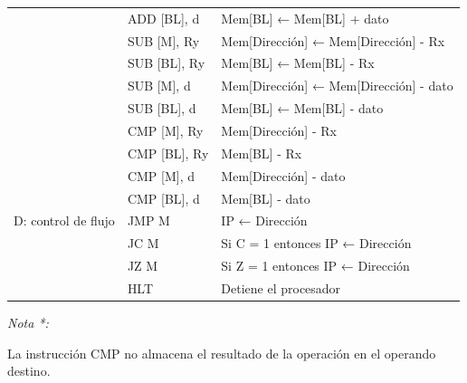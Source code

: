 \documentclass[12pt,oneside]{templates/unerthesis}
\begin{document}
\begin{table}[!h]
{\begin{threeparttable}
\begin{tabular}[t]{>{\raggedright\arraybackslash}p{4cm}>{\raggedright\arraybackslash}p{3cm}>{\raggedright\arraybackslash}p{8cm}}
 & ADD [BL], d & Mem[BL] ← Mem[BL] + dato\\
 & SUB [M], Ry & Mem[Dirección] ← Mem[Dirección] - Rx\\
\addlinespace
 & SUB [BL], Ry & Mem[BL] ← Mem[BL] - Rx\\
 & SUB [M], d & Mem[Dirección] ← Mem[Dirección] - dato\\
 & SUB [BL], d & Mem[BL] ← Mem[BL] - dato\\
 & CMP [M], Ry & Mem[Dirección] - Rx\\
 & CMP [BL], Ry & Mem[BL] - Rx\\
\addlinespace
 & CMP [M], d & Mem[Dirección] - dato\\
 & CMP [BL], d & Mem[BL] - dato\\
D: control de flujo & JMP M & IP ← Dirección\\
 & JC M & Si C = 1 entonces IP ← Dirección\\
 & JZ M & Si Z = 1 entonces IP ← Dirección\\
\addlinespace
 & HLT & Detiene el procesador\\
\bottomrule
\end{tabular}
\begin{tablenotes}
\item \textit{Nota *: } 
\item La instrucción CMP no almacena el resultado de la operación en el operando destino.
\end{tablenotes}
\end{threeparttable}}
\end{table}
\end{document}
